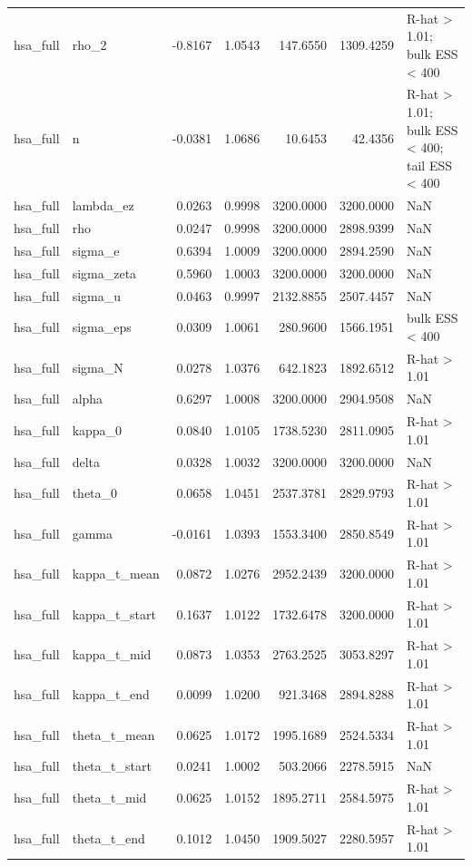\begin{tabular}{llrrrrl}
hsa\_full & rho\_2 & -0.8167 & 1.0543 & 147.6550 & 1309.4259 & R-hat > 1.01; bulk ESS < 400 \\
hsa\_full & n & -0.0381 & 1.0686 & 10.6453 & 42.4356 & R-hat > 1.01; bulk ESS < 400; tail ESS < 400 \\
hsa\_full & lambda\_ez & 0.0263 & 0.9998 & 3200.0000 & 3200.0000 & NaN \\
hsa\_full & rho & 0.0247 & 0.9998 & 3200.0000 & 2898.9399 & NaN \\
hsa\_full & sigma\_e & 0.6394 & 1.0009 & 3200.0000 & 2894.2590 & NaN \\
hsa\_full & sigma\_zeta & 0.5960 & 1.0003 & 3200.0000 & 3200.0000 & NaN \\
hsa\_full & sigma\_u & 0.0463 & 0.9997 & 2132.8855 & 2507.4457 & NaN \\
hsa\_full & sigma\_eps & 0.0309 & 1.0061 & 280.9600 & 1566.1951 & bulk ESS < 400 \\
hsa\_full & sigma\_N & 0.0278 & 1.0376 & 642.1823 & 1892.6512 & R-hat > 1.01 \\
hsa\_full & alpha & 0.6297 & 1.0008 & 3200.0000 & 2904.9508 & NaN \\
hsa\_full & kappa\_0 & 0.0840 & 1.0105 & 1738.5230 & 2811.0905 & R-hat > 1.01 \\
hsa\_full & delta & 0.0328 & 1.0032 & 3200.0000 & 3200.0000 & NaN \\
hsa\_full & theta\_0 & 0.0658 & 1.0451 & 2537.3781 & 2829.9793 & R-hat > 1.01 \\
hsa\_full & gamma & -0.0161 & 1.0393 & 1553.3400 & 2850.8549 & R-hat > 1.01 \\
hsa\_full & kappa\_t\_mean & 0.0872 & 1.0276 & 2952.2439 & 3200.0000 & R-hat > 1.01 \\
hsa\_full & kappa\_t\_start & 0.1637 & 1.0122 & 1732.6478 & 3200.0000 & R-hat > 1.01 \\
hsa\_full & kappa\_t\_mid & 0.0873 & 1.0353 & 2763.2525 & 3053.8297 & R-hat > 1.01 \\
hsa\_full & kappa\_t\_end & 0.0099 & 1.0200 & 921.3468 & 2894.8288 & R-hat > 1.01 \\
hsa\_full & theta\_t\_mean & 0.0625 & 1.0172 & 1995.1689 & 2524.5334 & R-hat > 1.01 \\
hsa\_full & theta\_t\_start & 0.0241 & 1.0002 & 503.2066 & 2278.5915 & NaN \\
hsa\_full & theta\_t\_mid & 0.0625 & 1.0152 & 1895.2711 & 2584.5975 & R-hat > 1.01 \\
hsa\_full & theta\_t\_end & 0.1012 & 1.0450 & 1909.5027 & 2280.5957 & R-hat > 1.01 \\

\end{tabular}
